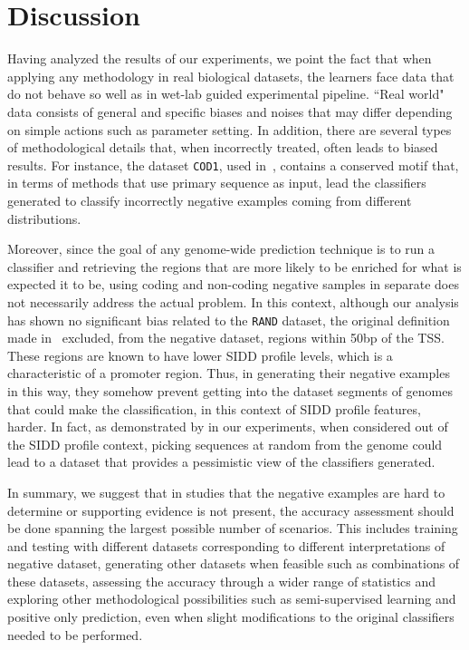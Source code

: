 \documentclass[conference]{IEEEtran}
\begin{document}
\section{Discussion}

Having analyzed the results of our experiments, we point the fact that when applying any methodology in real biological datasets, the learners face data that do not behave so well as in wet-lab guided experimental pipeline. ``Real world" data consists of general and specific biases and noises that may differ depending on simple actions such as parameter setting. In addition, there are several types of methodological details that, when incorrectly treated, often leads to biased results. For instance, the dataset {\tt COD1}, used in~\cite{gordon2003,song2011a}, contains a conserved motif that, in terms of methods that use primary sequence as input, lead the classifiers generated to classify incorrectly negative examples coming from different distributions. 

Moreover, since the goal of any genome-wide prediction technique is to run a classifier and retrieving the regions that are more likely to be enriched for what is expected it to be, using coding and non-coding negative samples in separate does not necessarily address the actual problem. In this context, although our analysis has shown no significant bias related to the {\tt RAND} dataset, the original definition made in~\cite{bland2010} excluded, from the negative dataset, regions within 50bp of the TSS. These regions are known to have lower SIDD profile levels, which is a characteristic of a promoter region. Thus, in generating their negative examples in this way, they somehow prevent getting into the dataset segments of genomes that could make the classification, in this context of SIDD profile features, harder. In fact, as demonstrated by in our experiments, when considered out of the SIDD profile context, picking sequences at random from the genome could lead to a dataset that provides a pessimistic view of the classifiers generated.

In summary, we suggest that in studies that the negative examples are hard to determine or supporting evidence is not present, the accuracy assessment should be done spanning the largest possible number of scenarios. This includes training and testing with different datasets corresponding to different interpretations of negative dataset, generating other datasets when feasible such as combinations of these datasets, assessing the accuracy through a wider range of statistics and exploring other methodological possibilities such as semi-supervised learning and positive only prediction, even when slight modifications to the original classifiers needed to be performed. 
\end{document}
